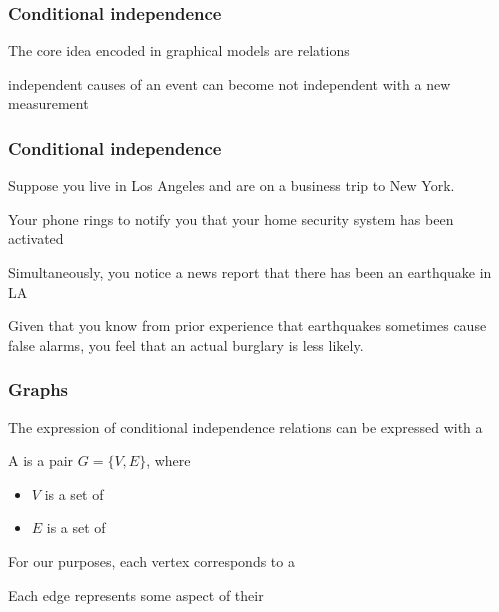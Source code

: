 \documentclass[12pt]{beamer}
\date{}
\begin{document}
\title{}
\subtitle{\classTitle}

\begin{frame}
\maketitle
%
\organization
%
\end{frame}

\begin{frame}[fragile]
\frametitle{Conditional independence}
The core idea encoded in graphical models are  relations

\vsp
{} independent causes of an event can become not independent with 
a new measurement
\end{frame}

\begin{frame}[fragile]
\frametitle{Conditional independence}

 Suppose you live in Los Angeles and are on a business trip to New York.

\vsp
Your phone rings to notify you that your home security system has been activated

\vsp
Simultaneously, you notice a news report that there has been an earthquake in LA

\vsp
Given that you know from prior experience that earthquakes sometimes cause false alarms, 
you feel that an actual burglary is less likely.
\end{frame}

\begin{frame}[fragile]
\frametitle{Graphs}
The expression of conditional independence relations can be expressed with a 

\vsp
A  is a pair $G = \{V,E\}$, where 
\begin{itemize}
\item $V$ is a set of 
\item $E$ is a set of 

\end{itemize}
\vsp

For our purposes, each vertex corresponds to a 

\vsp
Each edge represents some aspect of their 

\end{frame}
\end{document}
